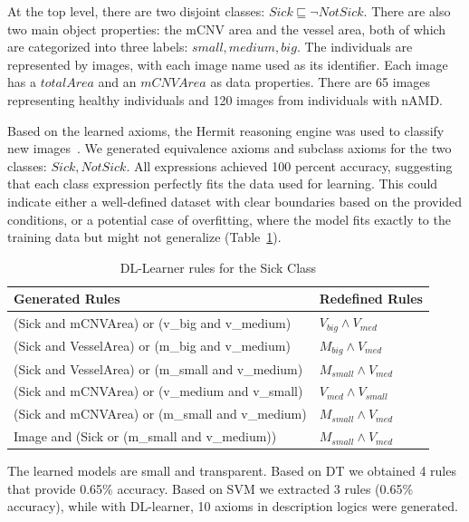 \documentclass[conference]{IEEEtran}
\begin{document}
At the top level, there are two disjoint classes: $Sick \sqsubseteq \neg NotSick$. 
There are also two main object properties: the mCNV area and the vessel area, both of which are categorized into three labels: \(small, medium, big\). 
The individuals are represented by images, with each image name used as its identifier. Each image has a $totalArea$ and an $mCNVArea$ as data properties. 
There are 65 images representing healthy individuals and 120 images from individuals with nAMD.

Based on the learned axioms, the Hermit reasoning engine was used to classify new images~\cite{abicht2023owl}. 
We generated equivalence axioms and subclass axioms for the two classes: \(Sick, NotSick\). 
All expressions achieved 100 percent accuracy, suggesting that each class expression perfectly fits the data used for learning. 
This could indicate either a well-defined dataset with clear boundaries based on the provided conditions, or a potential case of overfitting, where the model fits exactly to the training data but might not generalize (Table~\ref{tab:dl_learner_rules_sick}).

\begin{table}%
    \centering
    \caption{DL-Learner rules for the Sick Class}
    \begin{tabular}{ll}
        \textbf{Generated Rules} & \textbf{Redefined Rules} \\
        \hline
        (Sick and mCNVArea) or (v\_big and v\_medium) & $V_{big} \wedge V_{med}$ \\
        (Sick and VesselArea) or (m\_big and v\_medium) & $M_{big} \wedge V_{med}$ \\
        (Sick and VesselArea) or (m\_small and v\_medium) & $M_{small} \wedge V_{med}$ \\
        (Sick and mCNVArea) or (v\_medium and v\_small) & $V_{med} \wedge V_{small}$ \\
        (Sick and mCNVArea) or (m\_small and v\_medium) & $M_{small} \wedge V_{med}$ \\
        Image and (Sick or (m\_small and v\_medium)) & $M_{small} \wedge V_{med}$ \\
    \end{tabular}
    \label{tab:dl_learner_rules_sick}
\end{table}

The learned models are small and transparent. Based on DT we obtained 4 rules that provide 0.65\% accuracy.
Based on SVM we extracted 3 rules (0.65\% accuracy), while with DL-learner, 10 axioms in description logics were generated.
\end{document}
